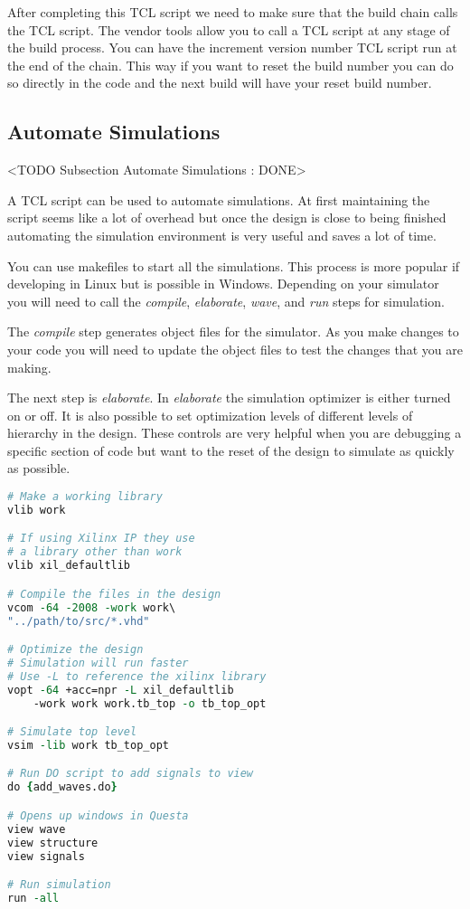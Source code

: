 After completing this \ac{TCL} script we need to make sure that the build chain calls the \ac{TCL} script. The vendor tools allow you to call a \ac{TCL} script at any stage of the build process. You can have the increment version number \ac{TCL} script run at the end of the chain. This way if you want to reset the build number you can do so directly in the code and the next build will have your reset build number. 
	
\subsection{Automate Simulations}
	<TODO Subsection Automate Simulations : DONE>

A \ac{TCL} script can be used to automate simulations. At first maintaining the script seems like a lot of overhead but once the design is close to being finished automating the simulation environment is very useful and saves a lot of time.
 
You can use makefiles to start all the simulations. This process is more popular if developing in Linux but is possible in Windows. Depending on your simulator you will need to call the \emph{compile}, \emph{elaborate}, \emph{wave}, and \emph{run} steps for simulation. 

The \emph{compile} step generates object files for the simulator. As you make changes to your code you will need to update the object files to test the changes that you are making. 

The next step is \emph{elaborate}. In \emph{elaborate} the simulation optimizer is either turned on or off. It is also possible to set optimization levels of different levels of hierarchy in the design. These controls are very helpful when you are debugging a specific section of code but want to the reset of the design to simulate as quickly as possible.

\begin{lstlisting}[language=tcl]
# Make a working library
vlib work

# If using Xilinx IP they use
# a library other than work
vlib xil_defaultlib

# Compile the files in the design
vcom -64 -2008 -work work\
"../path/to/src/*.vhd"

# Optimize the design
# Simulation will run faster
# Use -L to reference the xilinx library
vopt -64 +acc=npr -L xil_defaultlib 
    -work work work.tb_top -o tb_top_opt

# Simulate top level	
vsim -lib work tb_top_opt

# Run DO script to add signals to view
do {add_waves.do}

# Opens up windows in Questa
view wave
view structure
view signals

# Run simulation
run -all
\end{lstlisting}

